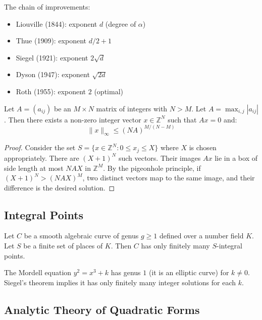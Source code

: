 The chain of improvements:
\begin{itemize}
    \item Liouville (1844): exponent $d$ (degree of $\alpha$)
    \item Thue (1909): exponent $d/2 + 1$
    \item Siegel (1921): exponent $2\sqrt{d}$
    \item Dyson (1947): exponent $\sqrt{2d}$
    \item Roth (1955): exponent $2$ (optimal)
\end{itemize}

\begin{theorem}
Let $A = (a_{ij})$ be an $M \times N$ matrix of integers with $N > M$. Let $A = \max_{i,j} |a_{ij}|$. Then there exists a non-zero integer vector $x \in \mathbb{Z}^N$ such that $Ax = 0$ and:
\[
\|x\|_\infty \leq (NA)^{M/(N-M)}
\]
\end{theorem}

\begin{proof}
Consider the set $S = \{x \in \mathbb{Z}^N : 0 \leq x_j \leq X\}$ where $X$ is chosen appropriately. There are $(X+1)^N$ such vectors. Their images $Ax$ lie in a box of side length at most $NAX$ in $\mathbb{Z}^M$. By the pigeonhole principle, if $(X+1)^N > (NAX)^M$, two distinct vectors map to the same image, and their difference is the desired solution.
\end{proof}

\subsection{Integral Points}

\begin{theorem}
Let $C$ be a smooth algebraic curve of genus $g \geq 1$ defined over a number field $K$. Let $S$ be a finite set of places of $K$. Then $C$ has only finitely many $S$-integral points.
\end{theorem}

\begin{example}
The Mordell equation $y^2 = x^3 + k$ has genus $1$ (it is an elliptic curve) for $k \neq 0$. Siegel's theorem implies it has only finitely many integer solutions for each $k$.
\end{example}

\subsection{Analytic Theory of Quadratic Forms}

